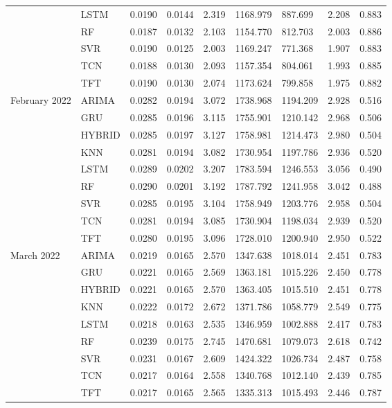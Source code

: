 \begin{tabular}{lllllllll}
 & LSTM & 0.0190 & 0.0144 & 2.319 & 1168.979 & 887.699 & 2.208 & 0.883 \\
 & RF & 0.0187 & 0.0132 & 2.103 & 1154.770 & 812.703 & 2.003 & 0.886 \\
 & SVR & 0.0190 & 0.0125 & 2.003 & 1169.247 & 771.368 & 1.907 & 0.883 \\
 & TCN & 0.0188 & 0.0130 & 2.093 & 1157.354 & 804.061 & 1.993 & 0.885 \\
 & TFT & 0.0190 & 0.0130 & 2.074 & 1173.624 & 799.858 & 1.975 & 0.882 \\
February 2022 & ARIMA & 0.0282 & 0.0194 & 3.072 & 1738.968 & 1194.209 & 2.928 & 0.516 \\
 & GRU & 0.0285 & 0.0196 & 3.115 & 1755.901 & 1210.142 & 2.968 & 0.506 \\
 & HYBRID & 0.0285 & 0.0197 & 3.127 & 1758.981 & 1214.473 & 2.980 & 0.504 \\
 & KNN & 0.0281 & 0.0194 & 3.082 & 1730.954 & 1197.786 & 2.936 & 0.520 \\
 & LSTM & 0.0289 & 0.0202 & 3.207 & 1783.594 & 1246.553 & 3.056 & 0.490 \\
 & RF & 0.0290 & 0.0201 & 3.192 & 1787.792 & 1241.958 & 3.042 & 0.488 \\
 & SVR & 0.0285 & 0.0195 & 3.104 & 1758.949 & 1203.776 & 2.958 & 0.504 \\
 & TCN & 0.0281 & 0.0194 & 3.085 & 1730.904 & 1198.034 & 2.939 & 0.520 \\
 & TFT & 0.0280 & 0.0195 & 3.096 & 1728.010 & 1200.940 & 2.950 & 0.522 \\
March 2022 & ARIMA & 0.0219 & 0.0165 & 2.570 & 1347.638 & 1018.014 & 2.451 & 0.783 \\
 & GRU & 0.0221 & 0.0165 & 2.569 & 1363.181 & 1015.226 & 2.450 & 0.778 \\
 & HYBRID & 0.0221 & 0.0165 & 2.570 & 1363.405 & 1015.510 & 2.451 & 0.778 \\
 & KNN & 0.0222 & 0.0172 & 2.672 & 1371.786 & 1058.779 & 2.549 & 0.775 \\
 & LSTM & 0.0218 & 0.0163 & 2.535 & 1346.959 & 1002.888 & 2.417 & 0.783 \\
 & RF & 0.0239 & 0.0175 & 2.745 & 1470.681 & 1079.073 & 2.618 & 0.742 \\
 & SVR & 0.0231 & 0.0167 & 2.609 & 1424.322 & 1026.734 & 2.487 & 0.758 \\
 & TCN & 0.0217 & 0.0164 & 2.558 & 1340.768 & 1012.140 & 2.439 & 0.785 \\
 & TFT & 0.0217 & 0.0165 & 2.565 & 1335.313 & 1015.493 & 2.446 & 0.787 \\

\end{tabular}
